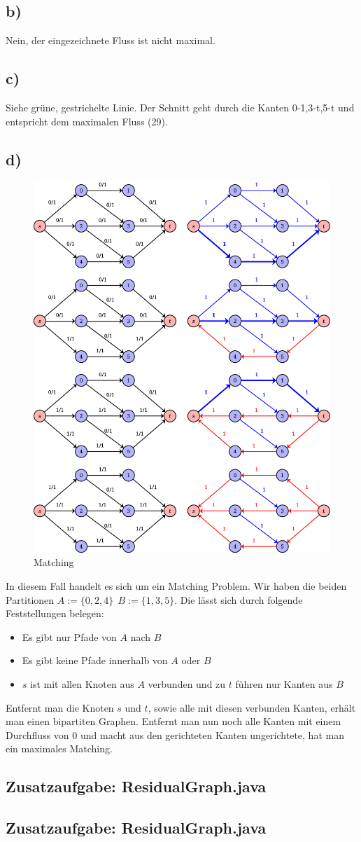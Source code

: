 \documentclass[a4paper,11pt,twoside]{scrartcl}
\begin{document}
\subsection*{b)}
Nein, der eingezeichnete Fluss ist nicht maximal.
\subsection*{c)}
Siehe grüne, gestrichelte Linie. Der Schnitt geht durch die Kanten 0-1,3-t,5-t und entspricht dem maximalen Fluss (29).

\pagebreak

\subsection*{d)}

\begin{figure}[H]
	\centering
	\includegraphics[width=0.75\linewidth]{Grafik/Diagramm2}
	\caption{Matching}
	\label{fig:Matching}
\end{figure}
In diesem Fall handelt es sich um ein Matching Problem. Wir haben die beiden Partitionen $A:=\{0,2,4\}~~B:=\{1,3,5\}$. Die lässt sich durch folgende Feststellungen belegen:
\begin{itemize}
	\item Es gibt nur Pfade von $A$ nach $B$
	\item Es gibt keine Pfade innerhalb von $A$ oder $B$
	\item $s$ ist mit allen Knoten aus $A$ verbunden und zu $t$ führen nur Kanten aus $B$
\end{itemize}
Entfernt man die Knoten $s$ und $t$, sowie alle mit diesen verbunden Kanten, erhält man einen bipartiten Graphen. Entfernt man nun noch alle Kanten mit einem Durchfluss von $0$ und macht aus den gerichteten Kanten ungerichtete, hat man ein maximales Matching.
\subsection*{Zusatzaufgabe: ResidualGraph.java}

\subsection*{Zusatzaufgabe: ResidualGraph.java}

\end{document}
